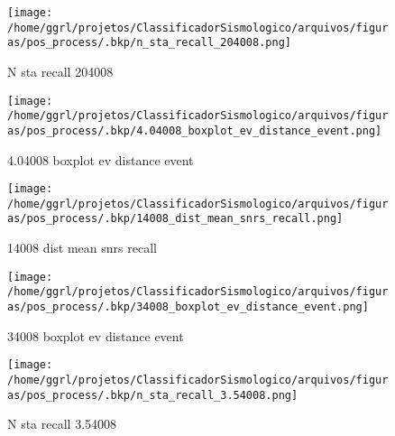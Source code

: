                     \begin{figure}[H]
                        \centering
                        \texttt{[image: /home/ggrl/projetos/ClassificadorSismologico/arquivos/figuras/pos\_process/.bkp/n\_sta\_recall\_204008.png]}
                        \caption{N sta recall 204008}
                        \label{fig:n_sta_recall_204008}
                    \end{figure}
                

                    \begin{figure}[H]
                        \centering
                        \texttt{[image: /home/ggrl/projetos/ClassificadorSismologico/arquivos/figuras/pos\_process/.bkp/4.04008\_boxplot\_ev\_distance\_event.png]}
                        \caption{4.04008 boxplot ev distance event}
                        \label{fig:4.04008_boxplot_ev_distance_event}
                    \end{figure}
                

                    \begin{figure}[H]
                        \centering
                        \texttt{[image: /home/ggrl/projetos/ClassificadorSismologico/arquivos/figuras/pos\_process/.bkp/14008\_dist\_mean\_snrs\_recall.png]}
                        \caption{14008 dist mean snrs recall}
                        \label{fig:14008_dist_mean_snrs_recall}
                    \end{figure}
                

                    \begin{figure}[H]
                        \centering
                        \texttt{[image: /home/ggrl/projetos/ClassificadorSismologico/arquivos/figuras/pos\_process/.bkp/34008\_boxplot\_ev\_distance\_event.png]}
                        \caption{34008 boxplot ev distance event}
                        \label{fig:34008_boxplot_ev_distance_event}
                    \end{figure}
                

                    \begin{figure}[H]
                        \centering
                        \texttt{[image: /home/ggrl/projetos/ClassificadorSismologico/arquivos/figuras/pos\_process/.bkp/n\_sta\_recall\_3.54008.png]}
                        \caption{N sta recall 3.54008}
                        \label{fig:n_sta_recall_3.54008}
                    \end{figure}
                

